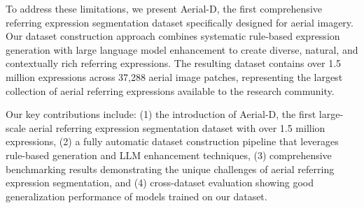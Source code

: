 To address these limitations, we present Aerial-D, the first comprehensive referring expression segmentation dataset specifically designed for aerial imagery. Our dataset construction approach combines systematic rule-based expression generation with large language model enhancement to create diverse, natural, and contextually rich referring expressions. The resulting dataset contains over 1.5 million expressions across 37,288 aerial image patches, representing the largest collection of aerial referring expressions available to the research community.

Our key contributions include: (1) the introduction of Aerial-D, the first large-scale aerial referring expression segmentation dataset with over 1.5 million expressions, (2) a fully automatic dataset construction pipeline that leverages rule-based generation and LLM enhancement techniques, (3) comprehensive benchmarking results demonstrating the unique challenges of aerial referring expression segmentation, and (4) cross-dataset evaluation showing good generalization performance of models trained on our dataset.

